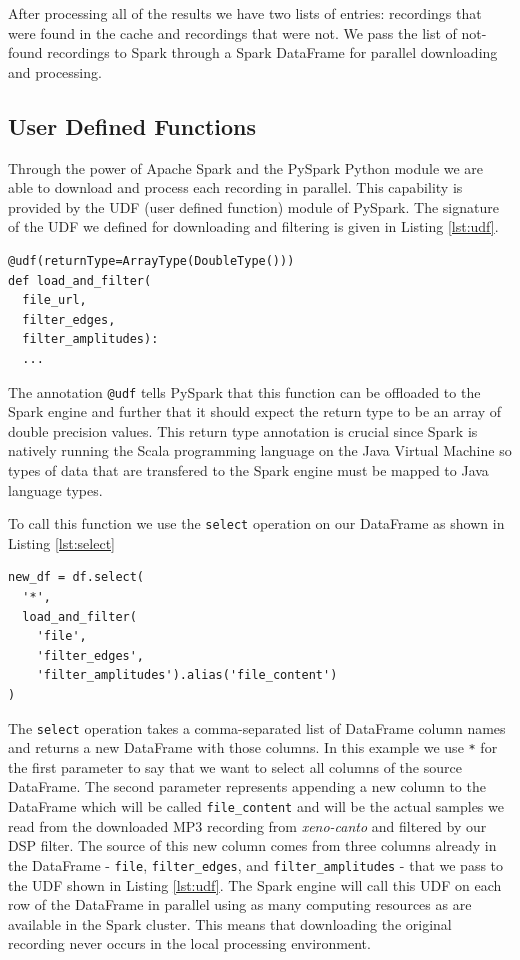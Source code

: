 \documentclass[conference,twoside]{IEEEtran}
\newcommand{\code}[1]{\texttt{#1}}
\begin{document}
After processing all of the results we have two lists of entries: recordings that were found in the cache and recordings that were not. We pass the list of not-found recordings to Spark through a Spark DataFrame for parallel downloading and processing.

\subsection{User Defined Functions}
Through the power of Apache Spark and the PySpark Python module we are able to download and process each recording in parallel. This capability is provided by the UDF (user defined function) module of PySpark. The signature of the UDF we defined for downloading and filtering is given in Listing \ref{lst:udf}.
\begin{lstlisting}[language=Txt, caption={PySpark User Defined Functions}, label={lst:udf}]
@udf(returnType=ArrayType(DoubleType()))
def load_and_filter(
  file_url,
  filter_edges,
  filter_amplitudes):
  ...
\end{lstlisting}
The annotation \code{@udf} tells PySpark that this function can be offloaded to the Spark engine and further that it should expect the return type to be an array of double precision values. This return type annotation is crucial since Spark is natively running the Scala programming language on the Java Virtual Machine so types of data that are transfered to the Spark engine must be mapped to Java language types.

To call this function we use the \code{select} operation on our DataFrame as shown in Listing \ref{lst:select}
\begin{lstlisting}[language=Txt, caption={PySpark DataFrame Select()}, label={lst:select}]
new_df = df.select(
  '*',
  load_and_filter(
    'file',
    'filter_edges',
    'filter_amplitudes').alias('file_content')
)
\end{lstlisting}
The \code{select} operation takes a comma-separated list of DataFrame column names and returns a new DataFrame with those columns. In this example we use \code{*} for the first parameter to say that we want to select all columns of the source DataFrame. The second parameter represents appending a new column to the DataFrame which will be called \code{file\_content} and will be the actual samples we read from the downloaded MP3 recording from \textit{xeno-canto} and filtered by our DSP filter. The source of this new column comes from three columns already in the DataFrame - \code{file}, \code{filter\_edges}, and \code{filter\_amplitudes} - that we pass to the UDF shown in Listing \ref{lst:udf}. The Spark engine will call this UDF on each row of the DataFrame in parallel using as many computing resources as are available in the Spark cluster. This means that downloading the original recording never occurs in the local processing environment.
\end{document}
